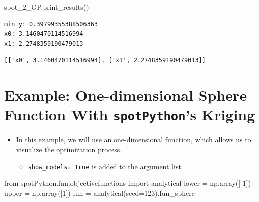 \documentclass[
  letterpaper,
  DIV=11,
  numbers=noendperiod]{scrreprt}
\newenvironment{Shaded}{\begin{snugshade}}{\end{snugshade}}
\newcommand{\DecValTok}[1]{\textcolor[rgb]{0.68,0.00,0.00}{#1}}
\newcommand{\ImportTok}[1]{\textcolor[rgb]{0.00,0.46,0.62}{#1}}
\newcommand{\NormalTok}[1]{\textcolor[rgb]{0.00,0.23,0.31}{#1}}
\newcommand{\OperatorTok}[1]{\textcolor[rgb]{0.37,0.37,0.37}{#1}}
\providecommand{\tightlist}{%
  \setlength{\itemsep}{0pt}\setlength{\parskip}{0pt}}\usepackage{longtable,booktabs,array}
\begin{document}
\begin{Shaded}
\begin{Highlighting}[]
\NormalTok{spot\_2\_GP.print\_results()}
\end{Highlighting}
\end{Shaded}

\begin{verbatim}
min y: 0.39799355388506363
x0: 3.1460470114516994
x1: 2.2748359190479013
\end{verbatim}

\begin{verbatim}
[['x0', 3.1460470114516994], ['x1', 2.2748359190479013]]
\end{verbatim}

\hypertarget{example-one-dimensional-sphere-function-with-spotpythons-kriging}{%
\section{\texorpdfstring{Example: One-dimensional Sphere Function With
\texttt{spotPython}'s
Kriging}{Example: One-dimensional Sphere Function With spotPython's Kriging}}\label{example-one-dimensional-sphere-function-with-spotpythons-kriging}}

\begin{itemize}
\tightlist
\item
  In this example, we will use an one-dimensional function, which allows
  us to visualize the optimization process.

  \begin{itemize}
  \tightlist
  \item
    \texttt{show\_models=\ True} is added to the argument list.
  \end{itemize}
\end{itemize}

\begin{Shaded}
\begin{Highlighting}[]
\ImportTok{from}\NormalTok{ spotPython.fun.objectivefunctions }\ImportTok{import}\NormalTok{ analytical}
\NormalTok{lower }\OperatorTok{=}\NormalTok{ np.array([}\OperatorTok{{-}}\DecValTok{1}\NormalTok{])}
\NormalTok{upper }\OperatorTok{=}\NormalTok{ np.array([}\DecValTok{1}\NormalTok{])}
\NormalTok{fun }\OperatorTok{=}\NormalTok{ analytical(seed}\OperatorTok{=}\DecValTok{123}\NormalTok{).fun\_sphere}
\end{Highlighting}
\end{Shaded}
\end{document}
